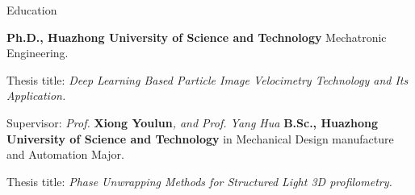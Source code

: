\begin{rubric}{Education}


\entry*[2012 -- 2018]%
	\textbf{Ph.D., Huazhong University of Science and Technology
} Mechatronic Engineering.
	\par Thesis title: \emph{Deep Learning Based Particle Image
Velocimetry Technology and Its Application.}
	\par Supervisor: \emph{Prof. }\textbf{Xiong Youlun}\emph{, and Prof. Yang Hua}
%
\entry*[2008 -- 2012]%
	\textbf{B.Sc., Huazhong University of Science and Technology
} in Mechanical Design manufacture and Automation Major.\par
	Thesis title: \emph{Phase Unwrapping Methods for Structured Light 3D profilometry.}
\end{rubric}